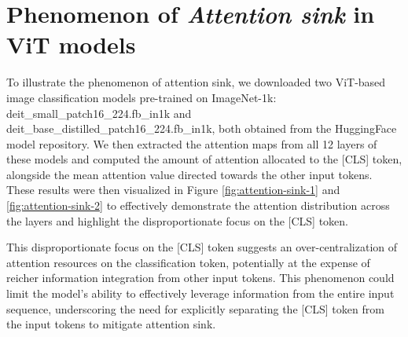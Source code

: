 \documentclass[anon,12pt]{colt2024} %
\begin{document}




\section{Phenomenon of \textit{Attention sink} in ViT models}

To illustrate the phenomenon of attention sink, we downloaded two ViT-based image classification models \cite{touvron2021training} pre-trained on ImageNet-1k: deit\_small\_patch16\_224.fb\_in1k and deit\_base\_distilled\_patch16\_224.fb\_in1k, both obtained from the HuggingFace model repository.
We then extracted the attention maps from all 12 layers of these models and computed the amount of attention allocated to the [CLS] token, alongside the mean attention value directed towards the other input tokens. 
These results were then visualized in Figure \ref{fig:attention-sink-1} and \ref{fig:attention-sink-2} to effectively demonstrate the attention distribution across the layers and highlight the disproportionate focus on the [CLS] token.

This disproportionate focus on the [CLS] token suggests an over-centralization of attention resources on the classification token, potentially at the expense of reicher information integration from other input tokens.
This phenomenon could limit the model's ability to effectively leverage information from the entire input sequence, underscoring the need for explicitly separating the [CLS] token from the input tokens to mitigate attention sink.
\end{document}
